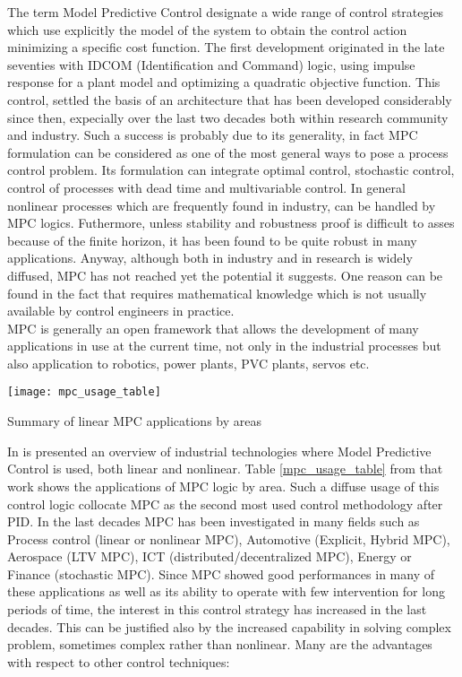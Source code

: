 The term Model Predictive Control designate a wide range of control strategies which use explicitly the model of the system to obtain the control action minimizing a specific cost function. The first development originated in the late seventies with IDCOM (Identification and Command) logic, using impulse response for a plant model and optimizing a quadratic objective function. This control, settled the basis of an architecture that has been developed considerably since then, expecially over the last two decades both within research community and industry.
Such a success is probably due to its generality, in fact MPC formulation can be considered as one of the most general ways to pose a process control problem. Its formulation can integrate optimal control, stochastic control, control of processes with dead time and multivariable control. In general nonlinear processes which are frequently found in industry, can be handled by MPC logics. Futhermore, unless stability and robustness proof is difficult to asses because of the finite horizon, it has been found to be quite robust in many applications. Anyway, although both in industry and in research is widely diffused, MPC has not reached yet the potential it suggests. One reason can be found in the fact that requires mathematical knowledge which is not usually available by control engineers in practice. \\
MPC is generally an open framework that allows the development of many applications in use at the current time, not only in the industrial processes but also application to robotics, power plants, PVC plants, servos etc. 
\begin{table}
	\centering
	\texttt{[image: mpc\_usage\_table]}
	\caption{Summary of linear MPC applications by areas}
	\label{mpc_usage_table}
\end{table}
In \cite{qin2003survey} is presented an overview of industrial technologies where Model Predictive Control is used, both linear and nonlinear. Table \ref{mpc_usage_table} from that work shows the applications of MPC logic by area. Such a diffuse usage of this control logic collocate MPC as the second most used control methodology after PID. In the last decades MPC has been investigated in many fields such as Process control (linear or nonlinear MPC), Automotive (Explicit, Hybrid MPC), Aerospace (LTV MPC), ICT (distributed/decentralized MPC), Energy or Finance (stochastic MPC). Since MPC showed good performances in many of these applications as well as its ability to operate with few intervention for long periods of time, the interest in this control strategy has increased in the last decades. This can be justified also by the increased capability in solving complex problem, sometimes complex rather than nonlinear. Many are the advantages with respect to other control techniques: 

